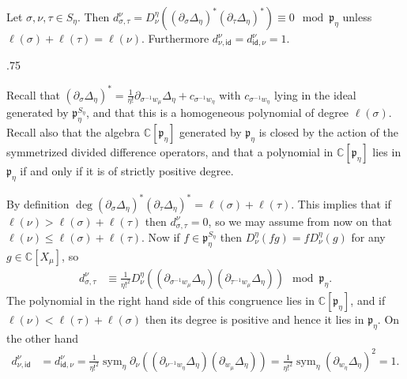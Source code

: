 \documentclass[11pt,fleqn]{article}
\makeatletter
\renewenvironment{proof}[1][\textit{Proof}]{\par
  \pushQED{\qed}%
  \normalfont \topsep.75\paraskip\relax
  \trivlist
  \item[\hskip\labelsep
        \itshape
    #1\@addpunct{.}]\ignorespaces
}{%
  \popQED\endtrivlist\@endpefalse
}
\newcommand\CC{\mathbb C}
\newcommand\id{\mathsf{id}}
\newcommand\p{\mathfrak p}
\DeclareMathOperator\sym{sym}
\makeatother
\begin{document}
\begin{Lemma*}
Let $\sigma, \nu, \tau \in S_\eta$. Then $d_{\sigma, \tau}^\nu = D_{\nu}^\eta(
(\partial_{\sigma} \Delta_\eta)^* (\partial_{\tau} \Delta_\eta)^* ) \equiv 0
\mod \p_\eta$ unless $\ell(\sigma) + \ell(\tau) = \ell(\nu)$. Furthermore
$d_{\nu, \id}^\nu = d_{\id, \nu}^\nu = 1$.
\end{Lemma*}
\begin{proof}
Recall that $(\partial_\sigma \Delta_\eta)^* = \frac{1}{\eta!}
\partial_{\sigma^{-1} w_\mu} \Delta_\eta + c_{\sigma^{-1}w_\eta}$ with 
$c_{\sigma^{-1}w_\eta}$ lying in the ideal generated by $\p_\eta^{S_\eta}$, 
and that this is a homogeneous polynomial of degree $\ell(\sigma)$.
Recall also that the algebra $\CC[\p_\eta]$ generated by $\p_\eta$ is closed 
by the action of the symmetrized divided difference operators, and that
a polynomial in $\CC[\p_\eta]$ lies in $\p_\eta$ if and only if it is of 
strictly positive degree.

By definition $\deg (\partial_\sigma \Delta_\eta)^* (\partial_\tau 
\Delta_\eta)^* = \ell(\sigma) + \ell(\tau)$. This implies that if 
$\ell(\nu) > \ell(\sigma) + \ell(\tau)$ then $d_{\sigma, \tau}^\nu = 0$,
so we may assume from now on that $\ell(\nu) \leq \ell(\sigma) + \ell(\tau)$.
Now if $f \in \p_\eta^{S_\eta}$ then $D_\nu^\eta(fg) = f D_\nu^\eta(g)$ for
any $g \in \CC[X_\mu]$, so 
\begin{align*}
d^\nu_{\sigma, \tau} 
  &\equiv \frac{1}{\eta!^2} D_\nu^\eta((\partial_{\sigma^{-1} w_\mu} 
    \Delta_\eta) (\partial_{\tau^{-1} w_\mu} \Delta_\eta)) \mod \p_\eta.
\end{align*} 
The polynomial in the right hand side of this congruence lies in 
$\CC[\p_\eta]$, and if $\ell(\nu) < \ell(\tau) + \ell(\sigma)$ then its degree
is positive and hence it lies in $\p_\eta$. On the other hand
\begin{align*}
d^\nu_{\nu, \id} 
  &= d^\nu_{\id, \nu}
  = \frac{1}{\eta!^2} \sym_\eta \partial_\nu((\partial_{\nu^{-1} w_\eta} 
    \Delta_\eta) (\partial_{w_\mu} \Delta_\eta)) 
  = \frac{1}{\eta!^2} \sym_\eta (\partial_{w_\eta} \Delta_\eta)^2
  = 1.
\end{align*} 
\end{proof}
\end{document}
